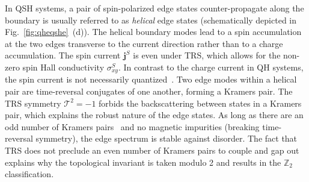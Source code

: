 In QSH systems, a pair of spin-polarized edge states counter-propagate along the boundary is usually referred to as \emph{helical} edge states (schematically depicted in Fig.~\ref{fig:qheqshe}~(d)). The helical boundary modes lead to a spin accumulation at the two edges transverse to the current direction rather than to a charge accumulation. The spin current $\mathbf{j}^S$ is even under TRS, which allows for the non-zero spin Hall conductivity $\sigma_{xy}^S$. In contrast to the charge current in QH systems, the spin current is not necessarily quantized~\cite{qsh-review, PhysRevB.100.245430}. Two edge modes within a helical pair are time-reversal conjugates of one another, forming a Kramers pair. The TRS symmetry $\mathcal{T}^2 = -1$ forbids the backscattering between states in a Kramers pair, which explains the robust nature of the edge states. As long as there are an odd number of Kramers pairs~\cite{PhysRevB.73.045322} and no magnetic impurities (breaking time-reversal symmetry), the edge spectrum is stable against disorder. The fact that TRS does not preclude an even number of Kramers pairs to couple and gap out explains why the topological invariant is taken modulo 2 and results in the $\mathbb{Z}_2$ classification.

